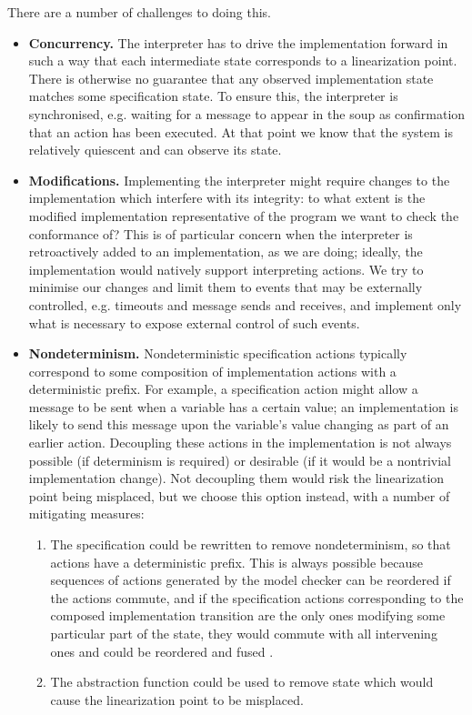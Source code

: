 \documentclass[a4paper]{article}
\begin{document}
There are a number of challenges to doing this.

\begin{itemize}
\item \textbf{Concurrency.} The interpreter has to drive the implementation forward in such a way that each intermediate state corresponds to a linearization point.
%
There is otherwise no guarantee that any observed implementation state matches some specification state.
%
To ensure this, the interpreter is synchronised, e.g. waiting for a message to appear in the soup as confirmation that an action has been executed.
%
At that point we know that the system is relatively quiescent and can observe its state.

\item \textbf{Modifications.} Implementing the interpreter might require changes to the implementation which interfere with its integrity: to what extent is the modified implementation representative of the program we want to check the conformance of?
%
This is of particular concern when the interpreter is retroactively added to an implementation, as we are doing; ideally, the implementation would natively support interpreting actions.
%
We try to minimise our changes and limit them to events that may be externally controlled, e.g. timeouts and message sends and receives, and implement only what is necessary to expose external control of such events.


\item \textbf{Nondeterminism.} Nondeterministic specification actions typically correspond to some composition of implementation actions with a deterministic prefix.
%
For example, a specification action might allow a message to be sent when a variable has a certain value; an implementation is likely to send this message upon the variable's value changing as part of an earlier action.
%
Decoupling these actions in the implementation is not always possible (if determinism is required) or desirable (if it would be a nontrivial implementation change).
%
Not decoupling them would risk the linearization point being misplaced, but we choose this option instead, with a number of mitigating measures:

\begin{enumerate}
\item The specification could be rewritten to remove nondeterminism, so that actions have a deterministic prefix.
%
This is always possible because sequences of actions generated by the model checker can be reordered if the actions commute, and if the specification actions corresponding to the composed implementation transition are the only ones modifying some particular part of the state, they would commute with all intervening ones and could be reordered and fused \cite{lipton1975reduction}.

\item The abstraction function could be used to remove state which would cause the linearization point to be misplaced.
\end{enumerate}

\end{itemize}
\end{document}
